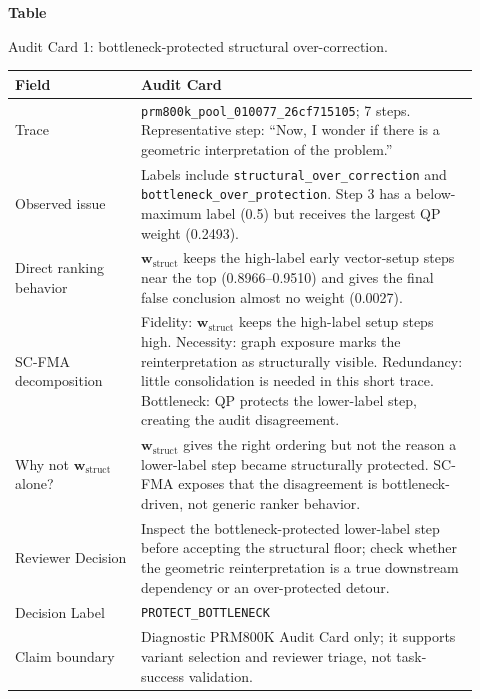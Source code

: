 \documentclass[a4paper,fleqn]{cas-sc}
\newcommand{\wstruct}{\ensuremath{\mathbf{w}_{\mathrm{struct}}}}
\begin{document}
\par\medskip
{}\label{tab:audit-card-geometric}
\noindent\textbf{Table~\thetable}\par
\noindent Audit Card 1: bottleneck-protected structural over-correction.
\begin{center}
\small
\renewcommand{\arraystretch}{1.08}
\begin{tabular}{p{0.25\linewidth}p{0.67\linewidth}}
\toprule
\textbf{Field} & \textbf{Audit Card} \\
\midrule
Trace & \texttt{prm800k\_pool\_010077\_26cf715105}; 7 steps. Representative step: ``Now, I wonder if there is a geometric interpretation of the problem.'' \\
Observed issue & Labels include \texttt{structural\_over\_correction} and \texttt{bottleneck\_over\_protection}. Step 3 has a below-maximum label (0.5) but receives the largest QP weight (0.2493). \\
Direct ranking behavior & \wstruct{} keeps the high-label early vector-setup steps near the top (0.8966--0.9510) and gives the final false conclusion almost no weight (0.0027). \\
SC-FMA decomposition & Fidelity: \wstruct{} keeps the high-label setup steps high. Necessity: graph exposure marks the reinterpretation as structurally visible. Redundancy: little consolidation is needed in this short trace. Bottleneck: QP protects the lower-label step, creating the audit disagreement. \\
Why not \wstruct{} alone? & \wstruct{} gives the right ordering but not the reason a lower-label step became structurally protected. SC-FMA exposes that the disagreement is bottleneck-driven, not generic ranker behavior. \\
Reviewer Decision & Inspect the bottleneck-protected lower-label step before accepting the structural floor; check whether the geometric reinterpretation is a true downstream dependency or an over-protected detour. \\
Decision Label & \texttt{PROTECT\_BOTTLENECK} \\
Claim boundary & Diagnostic PRM800K Audit Card only; it supports variant selection and reviewer triage, not task-success validation. \\
\bottomrule
\end{tabular}
\end{center}
\medskip
\end{document}
